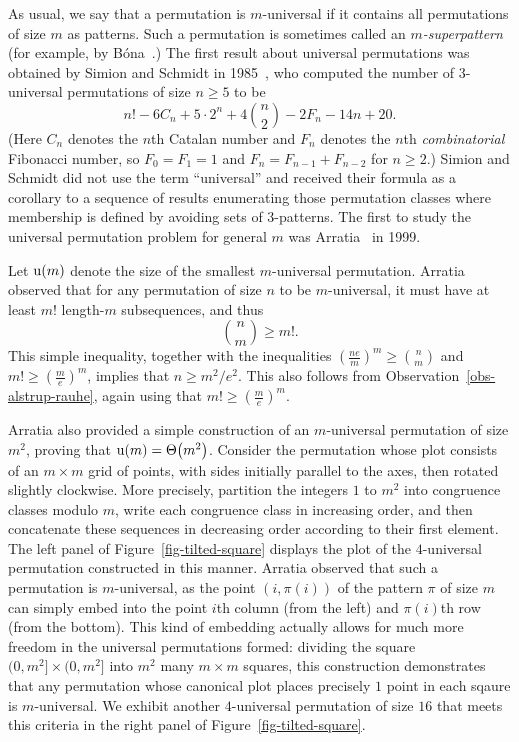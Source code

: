 As usual, we say that a permutation is $m$-universal if it contains all permutations of size $m$ as patterns. Such a permutation is sometimes called an \emph{$m$-superpattern} (for example, by B\'ona~\cite[Chapter 5, Exercises 19--22 and Problems Plus 9--12]{bona:combinatorics-o:}.) The first result about universal permutations was obtained by Simion and Schmidt in 1985~\cite[Section~5]{simion:restricted-perm:}, who computed the number of $3$-universal permutations of size $n \ge 5$ to be
\[
	n!
	- 6 C_n
	+ 5 \cdot 2^n
	+ 4 \binom{n}{2}
	- 2F_n
	- 14n
	+ 20.
\]
(Here $C_n$ denotes the $n$th Catalan number and $F_n$ denotes the $n$th \emph{combinatorial} Fibonacci number, so $F_0=F_1=1$ and $F_n=F_{n-1}+F_{n-2}$ for $n\ge 2$.) Simion and Schmidt did not use the term ``universal'' and received their formula as a corollary to a sequence of results enumerating those permutation classes where membership is defined by avoiding sets of $3$-patterns. The first to study the universal permutation problem for general $m$ was Arratia~\cite{arratia:on-the-stanley-:} in 1999.

Let $\operatorname{u}(m)$ denote the size of the smallest $m$-universal permutation. Arratia observed that for any permutation of size $n$ to be $m$-universal, it must have at least $m!$ length-$m$ subsequences, and thus
\[
	\binom{n}{m}
	\ge
	m!.
\]
This simple inequality, together with the inequalities $\left(\frac{ne}{m}\right)^m \ge \binom{n}{m}$ and $m! \ge \left(\frac{m}{e}\right)^m$, implies that $n \ge m^2/e^2$. This also follows from Observation~\ref{obs-alstrup-rauhe}, again using that $m! \ge \left(\frac{m}{e}\right)^m$.

Arratia also provided a simple construction of an $m$-universal permutation of size $m^2$, proving that $\operatorname{u}(m) = \Theta{\left(m^2\right)}$. Consider the permutation whose plot consists of an $m \times m$ grid of points, with sides initially parallel to the axes, then rotated slightly clockwise. More precisely, partition the integers $1$ to $m^2$ into congruence classes modulo $m$, write each congruence class in increasing order, and then concatenate these sequences in decreasing order according to their first element. The left panel of Figure~\ref{fig-tilted-square} displays the plot of the $4$-universal permutation constructed in this manner. Arratia observed that such a permutation is $m$-universal, as the point $(i, \pi(i))$ of the pattern $\pi$ of size $m$ can simply embed into the point $i$th column (from the left) and $\pi(i)$th row (from the bottom). This kind of embedding actually allows for much more freedom in the universal permutations formed: dividing the square $(0, m^2] \times (0, m^2]$ into $m^2$ many $m \times m$ squares, this construction demonstrates that any permutation whose canonical plot places precisely $1$ point in each sqaure is $m$-universal. We exhibit another $4$-universal permutation of size $16$ that meets this criteria in the right panel of Figure~\ref{fig-tilted-square}.

